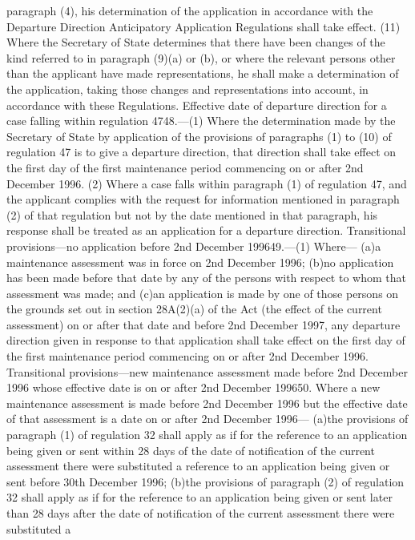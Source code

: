 \documentclass[a4paper]{article}
\begin{document}
paragraph (4), his determination of the application in accordance with the
Departure Direction Anticipatory Application Regulations shall take effect.
(11) Where the Secretary of State determines that there have been changes of the
kind referred to in paragraph (9)(a) or (b), or where the relevant persons other
than the applicant have made representations, he shall make a determination of
the application, taking those changes and representations into account, in
accordance with these Regulations.
Effective date of departure direction for a case falling within regulation
4748.—(1) Where the determination made by the Secretary of State by application
of the provisions of paragraphs (1) to (10) of regulation 47 is to give a
departure direction, that direction shall take effect on the first day of the
first maintenance period commencing on or after 2nd December 1996.
(2) Where a case falls within paragraph (1) of regulation 47, and the applicant
complies with the request for information mentioned in paragraph (2) of that
regulation but not by the date mentioned in that paragraph, his response shall
be treated as an application for a departure direction.
Transitional provisions—no application before 2nd December 199649.—(1) Where—
(a)a maintenance assessment was in force on 2nd December 1996;
(b)no application has been made before that date by any of the persons with
respect to whom that assessment was made; and
(c)an application is made by one of those persons on the grounds set out in
section 28A(2)(a) of the Act (the effect of the current assessment) on or after
that date and before 2nd December 1997,
any departure direction given in response to that application shall take effect
on the first day of the first maintenance period commencing on or after 2nd
December 1996.
Transitional provisions—new maintenance assessment made before 2nd December 1996
whose effective date is on or after 2nd December 199650. Where a new maintenance
assessment is made before 2nd December 1996 but the effective date of that
assessment is a date on or after 2nd December 1996—
(a)the provisions of paragraph (1) of regulation 32 shall apply as if for the
reference to an application being given or sent within 28 days of the date of
notification of the current assessment there were substituted a reference to an
application being given or sent before 30th December 1996;
(b)the provisions of paragraph (2) of regulation 32 shall apply as if for the
reference to an application being given or sent later than 28 days after the
date of notification of the current assessment there were substituted a
\end{document}
